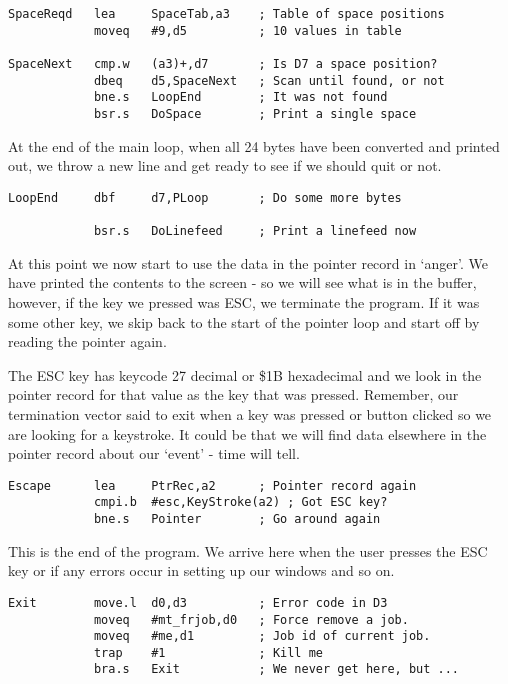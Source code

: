 \begin{lstlisting}[firstnumber=last,caption={Pointer Record Examiner - Space Table}]
SpaceReqd   lea     SpaceTab,a3    ; Table of space positions
            moveq   #9,d5          ; 10 values in table

SpaceNext   cmp.w   (a3)+,d7       ; Is D7 a space position?
            dbeq    d5,SpaceNext   ; Scan until found, or not
            bne.s   LoopEnd        ; It was not found
            bsr.s   DoSpace        ; Print a single space
\end{lstlisting}

At the end of the main loop, when all 24 bytes have been converted and printed out, we
throw a new line and get ready to see if we should quit or not.

\begin{lstlisting}[firstnumber=last,caption={Pointer Record Examiner - Loop End}]
LoopEnd     dbf     d7,PLoop       ; Do some more bytes
            
            bsr.s   DoLinefeed     ; Print a linefeed now
\end{lstlisting}

At this point we now start to use the data in the pointer record in `anger'. We have
printed the contents to the screen -{} so we will see what is in the buffer, however, if the
key we pressed was ESC, we terminate the program. If it was some other key, we skip back
to the start of the pointer loop and start off by reading the pointer again.

The ESC key has keycode 27 decimal or \$1B hexadecimal and we look in the pointer record
for that value as the key that was pressed. Remember, our termination vector said to exit
when a key was pressed or button clicked so we are looking for a keystroke. It could be
that we will find data elsewhere in the pointer record about our `event' -{} time will
tell.

\begin{lstlisting}[firstnumber=last,caption={Pointer Record Examiner - Handle ESC}]
Escape      lea     PtrRec,a2      ; Pointer record again
            cmpi.b  #esc,KeyStroke(a2) ; Got ESC key?
            bne.s   Pointer        ; Go around again
\end{lstlisting}

This is the end of the program. We arrive here when the user presses the ESC key or if any
errors occur in setting up our windows and so on.

\begin{lstlisting}[firstnumber=last,caption={Pointer Record Examiner - Exit Program}]
Exit        move.l  d0,d3          ; Error code in D3
            moveq   #mt_frjob,d0   ; Force remove a job.
            moveq   #me,d1         ; Job id of current job.
            trap    #1             ; Kill me
            bra.s   Exit           ; We never get here, but ...
\end{lstlisting}

